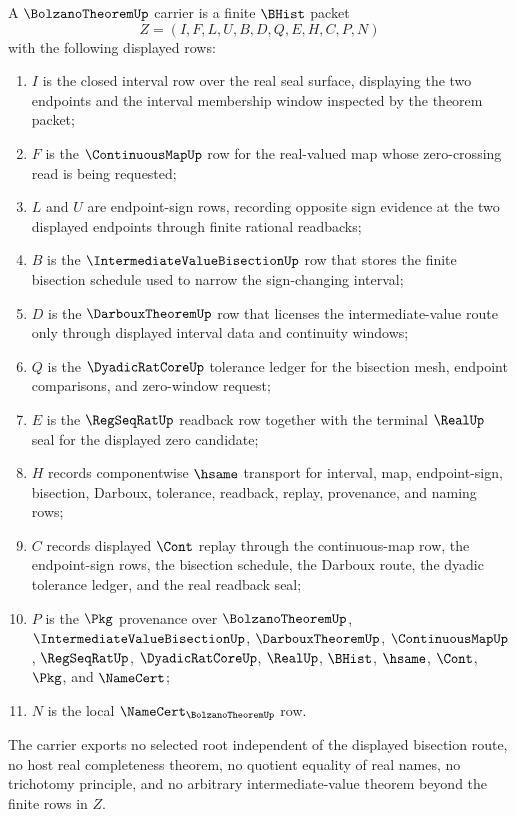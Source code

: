 \begin{definition}
\label{def:bolzano-theorem-carrier}
A $\BolzanoTheoremUp$ carrier is a finite $\BHist$ packet
$$
Z=(I,F,L,U,B,D,Q,E,H,C,P,N)
$$
with the following displayed rows:
\begin{enumerate}
\item $I$ is the closed interval row over the real seal surface, displaying the two endpoints and the interval membership window inspected by the theorem packet;
\item $F$ is the $\ContinuousMapUp$ row for the real-valued map whose zero-crossing read is being requested;
\item $L$ and $U$ are endpoint-sign rows, recording opposite sign evidence at the two displayed endpoints through finite rational readbacks;
\item $B$ is the $\IntermediateValueBisectionUp$ row that stores the finite bisection schedule used to narrow the sign-changing interval;
\item $D$ is the $\DarbouxTheoremUp$ row that licenses the intermediate-value route only through displayed interval data and continuity windows;
\item $Q$ is the $\DyadicRatCoreUp$ tolerance ledger for the bisection mesh, endpoint comparisons, and zero-window request;
\item $E$ is the $\RegSeqRatUp$ readback row together with the terminal $\RealUp$ seal for the displayed zero candidate;
\item $H$ records componentwise $\hsame$ transport for interval, map, endpoint-sign, bisection, Darboux, tolerance, readback, replay, provenance, and naming rows;
\item $C$ records displayed $\Cont$ replay through the continuous-map row, the endpoint-sign rows, the bisection schedule, the Darboux route, the dyadic tolerance ledger, and the real readback seal;
\item $P$ is the $\Pkg$ provenance over $\BolzanoTheoremUp$, $\IntermediateValueBisectionUp$, $\DarbouxTheoremUp$, $\ContinuousMapUp$, $\RegSeqRatUp$, $\DyadicRatCoreUp$, $\RealUp$, $\BHist$, $\hsame$, $\Cont$, $\Pkg$, and $\NameCert$;
\item $N$ is the local $\NameCert_{\BolzanoTheoremUp}$ row.
\end{enumerate}
The carrier exports no selected root independent of the displayed bisection route, no host real completeness theorem, no quotient equality of real names, no trichotomy principle, and no arbitrary intermediate-value theorem beyond the finite rows in $Z$.
\end{definition}

